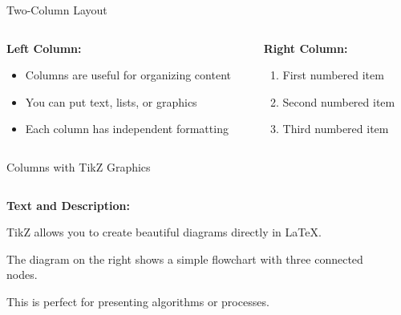 \documentclass[aspectratio=169]{beamer}
\begin{document}
\begin{frame}{Two-Column Layout}
  \begin{columns}
    \begin{column}{0.48\textwidth}
      \textbf{Left Column:}
      \begin{itemize}
        \item Columns are useful for organizing content
        \item You can put text, lists, or graphics
        \item Each column has independent formatting
      \end{itemize}
    \end{column}
    
    \begin{column}{0.48\textwidth}
      \textbf{Right Column:}
      \begin{enumerate}
        \item First numbered item
        \item Second numbered item
        \item Third numbered item
      \end{enumerate}
    \end{column}
  \end{columns}
\end{frame}

\begin{frame}{Columns with TikZ Graphics}
  \begin{columns}
    \begin{column}{0.5\textwidth}
      \textbf{Text and Description:}
      
      TikZ allows you to create beautiful diagrams directly in LaTeX.
      
      \vspace{0.3cm}
      
      The diagram on the right shows a simple flowchart with three connected nodes.
      
      \vspace{0.3cm}
      
      This is perfect for presenting algorithms or processes.
    \end{column}
    
    \begin{column}{0.5\textwidth}
      \begin{center}
      \end{center}
    \end{column}
  \end{columns}
\end{frame}
\end{document}
